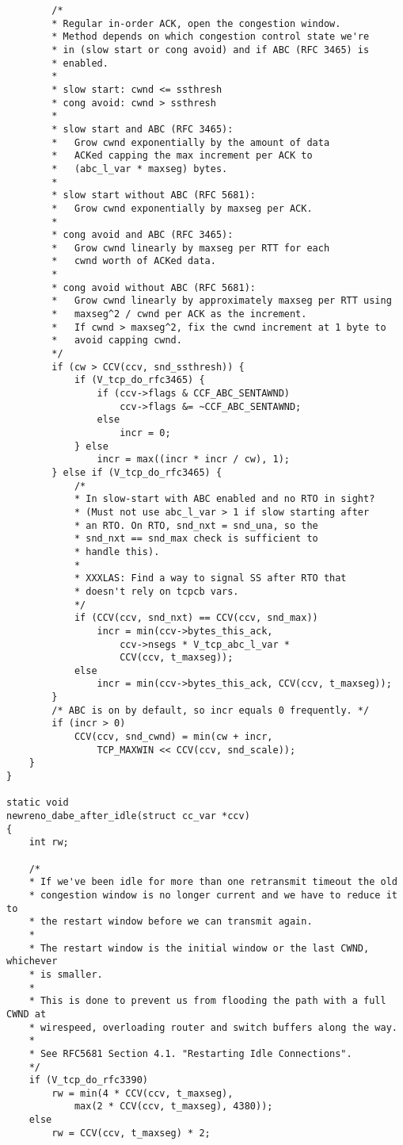 \begin{code}
\begin{verbatim}
        /*
        * Regular in-order ACK, open the congestion window.
        * Method depends on which congestion control state we're
        * in (slow start or cong avoid) and if ABC (RFC 3465) is
        * enabled.
        *
        * slow start: cwnd <= ssthresh
        * cong avoid: cwnd > ssthresh
        *
        * slow start and ABC (RFC 3465):
        *   Grow cwnd exponentially by the amount of data
        *   ACKed capping the max increment per ACK to
        *   (abc_l_var * maxseg) bytes.
        *
        * slow start without ABC (RFC 5681):
        *   Grow cwnd exponentially by maxseg per ACK.
        *
        * cong avoid and ABC (RFC 3465):
        *   Grow cwnd linearly by maxseg per RTT for each
        *   cwnd worth of ACKed data.
        *
        * cong avoid without ABC (RFC 5681):
        *   Grow cwnd linearly by approximately maxseg per RTT using
        *   maxseg^2 / cwnd per ACK as the increment.
        *   If cwnd > maxseg^2, fix the cwnd increment at 1 byte to
        *   avoid capping cwnd.
        */
        if (cw > CCV(ccv, snd_ssthresh)) {
            if (V_tcp_do_rfc3465) {
                if (ccv->flags & CCF_ABC_SENTAWND)
                    ccv->flags &= ~CCF_ABC_SENTAWND;
                else
                    incr = 0;
            } else
                incr = max((incr * incr / cw), 1);
        } else if (V_tcp_do_rfc3465) {
            /*
            * In slow-start with ABC enabled and no RTO in sight?
            * (Must not use abc_l_var > 1 if slow starting after
            * an RTO. On RTO, snd_nxt = snd_una, so the
            * snd_nxt == snd_max check is sufficient to
            * handle this).
            *
            * XXXLAS: Find a way to signal SS after RTO that
            * doesn't rely on tcpcb vars.
            */
            if (CCV(ccv, snd_nxt) == CCV(ccv, snd_max))
                incr = min(ccv->bytes_this_ack,
                    ccv->nsegs * V_tcp_abc_l_var *
                    CCV(ccv, t_maxseg));
            else
                incr = min(ccv->bytes_this_ack, CCV(ccv, t_maxseg));
        }
        /* ABC is on by default, so incr equals 0 frequently. */
        if (incr > 0)
            CCV(ccv, snd_cwnd) = min(cw + incr,
                TCP_MAXWIN << CCV(ccv, snd_scale));
    }
}

static void
newreno_dabe_after_idle(struct cc_var *ccv)
{
    int rw;

    /*
    * If we've been idle for more than one retransmit timeout the old
    * congestion window is no longer current and we have to reduce it to
    * the restart window before we can transmit again.
    *
    * The restart window is the initial window or the last CWND, whichever
    * is smaller.
    *
    * This is done to prevent us from flooding the path with a full CWND at
    * wirespeed, overloading router and switch buffers along the way.
    *
    * See RFC5681 Section 4.1. "Restarting Idle Connections".
    */
    if (V_tcp_do_rfc3390)
        rw = min(4 * CCV(ccv, t_maxseg),
            max(2 * CCV(ccv, t_maxseg), 4380));
    else
        rw = CCV(ccv, t_maxseg) * 2;


\end{verbatim}
\end{code}
